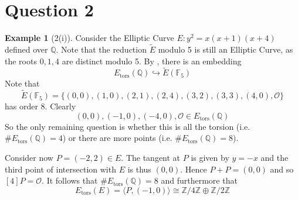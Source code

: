 \documentclass{scrartcl}
\newcommand{\Z}{\mathbb{Z}}
\newcommand{\F}{\mathbb{F}}
\newcommand{\Q}{\mathbb{Q}}
\renewcommand{\O}{\mathcal{O}}
\theoremstyle{definition}
\newtheorem{example}[subsection]{Example}
\begin{document}
\section{Question 2}
\begin{example}[2(i)]
    Consider the Elliptic Curve $E: y^2 = x(x + 1)(x + 4)$ defined over $\Q$.
    Note that the reduction $\tilde{E}$ modulo 5 is still an Elliptic Curve, as the roots $0, 1, 4$ are distinct modulo 5.
    By \cite[Lemma 5.1]{lecture}, there is an embedding
    \begin{equation*}
        E_{\mathrm{tors}}(\Q) \hookrightarrow \tilde{E}(\F_5)
    \end{equation*}
    Note that
    \begin{equation*}
        \tilde{E}(\F_5) = \{ (0, 0), (1, 0), (2, 1), (2, 4), (3, 2), (3, 3), (4, 0), \O \}
    \end{equation*}
    has order 8.
    Clearly
    \begin{equation*}
        (0, 0), (-1, 0), (-4, 0), \O \in E_{\mathrm{tors}}(\Q)
    \end{equation*}
    So the only remaining question is whether this is all the torsion (i.e. $\#E_{\mathrm{tors}}(\Q) = 4$) or there are more points (i.e. $\#E_{\mathrm{tors}}(\Q) = 8$).

    Consider now $P = (-2, 2) \in E$.
    The tangent at $P$ is given by $y = -x$ and the third point of intersection with $E$ is thus $(0, 0)$.
    Hence $P + P = (0, 0)$ and so $[4]P = \O$.
    It follows that $\#E_{\mathrm{tors}}(\Q) = 8$ and furthermore that 
    \begin{equation*}
        E_{\mathrm{tors}}(E) = \langle P, (-1, 0) \rangle \cong \Z/4\Z \oplus \Z/2\Z
    \end{equation*}
\end{example}
\end{document}
